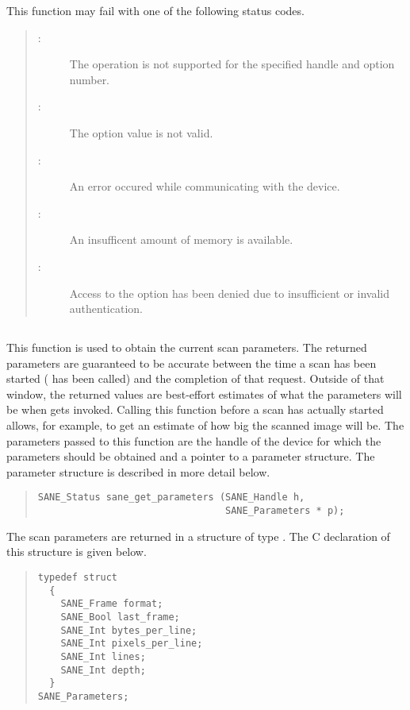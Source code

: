 \documentclass[11pt,DVIps]{report}
\begin{document}
This function may fail with one of the following status codes.
\begin{quote}
\begin{description}
\item[:] The operation is not
  supported for the specified handle and option number.
\item[:] The option value is not valid.
\item[:] An error occured while
  communicating with the device.
\item[:] An insufficent amount of memory
  is available.
\item[:] Access to the option has
  been denied due to insufficient or invalid authentication.
\end{description}
\end{quote}



\subsection{}

This function is used to obtain the current scan parameters.  The
returned parameters are guaranteed to be accurate between the time a
scan has been started ( has been called) and the
completion of that request.  Outside of that window, the returned
values are best-effort estimates of what the parameters will be when
 gets invoked.  Calling this function before a
scan has actually started allows, for example, to get an estimate of
how big the scanned image will be.  The parameters passed to this
function are the handle  of the device for which the
parameters should be obtained and a pointer  to a parameter
structure.  The parameter structure is described in more detail below.

\begin{quote}
\begin{verbatim}
SANE_Status sane_get_parameters (SANE_Handle h,
                                 SANE_Parameters * p);
\end{verbatim}
\end{quote}

The scan parameters are returned in a structure of type
.  The C declaration of this structure
is given below.
\begin{quote}
\begin{verbatim}
typedef struct
  {
    SANE_Frame format;
    SANE_Bool last_frame;
    SANE_Int bytes_per_line;
    SANE_Int pixels_per_line;
    SANE_Int lines;
    SANE_Int depth;
  }
SANE_Parameters;
\end{verbatim}
\end{quote}
\end{document}
